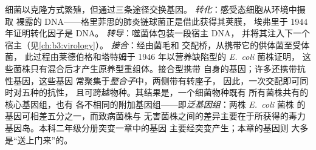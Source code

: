 \begin{definition}[基因水平转移]\label{def:b3:bacteriology:hgt}
细菌以克隆方式繁殖，但通过三条途径交换基因。
\emph{转化}：感受态细胞从环境中摄取
裸露的 DNA——格里菲思的肺炎链球菌正是借此获得其荚膜，
埃弗里于 1944 年证明转化因子是 DNA。
\emph{转导}：噬菌体包装一段宿主 DNA，
并将其注入下一个宿主（见\cref{ch:b3:virology}）。
\emph{接合}：经由菌毛和
交配桥，从携带它的供体菌至受体菌，
此过程由莱德伯格和塔特姆于 1946 年以营养缺陷型的 \emph{E.~coli} 菌株证明，
这些菌株只有混合后才产生原养型重组体。接合型携带
自身的基因；许多还携带抗性基因，这些基因
常聚集于\emph{整合子}中，两侧带有转座子，
因此，一次交配即可同时对五种的抗性，
且可跨越物种。其结果是，一个细菌物种既有
所有菌株共有的核心基因组，也有
各不相同的附加基因组——即\emph{泛基因组}：两株 \emph{E.~coli} 菌株
的基因可相差五分之一，而致病菌株与
无害菌株之间的差异主要在于所获得的毒力基因岛。本科二年级分册突变一章中的基因
主要经突变产生；本章的基因则
大多是“送上门来”的。
\end{definition}

